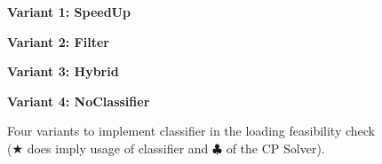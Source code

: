 \begin{figure}[ht]
    \centering

    \begin{minipage}[t]{0.45\textwidth}
        \textbf{Variant 1: SpeedUp}\par\vspace{0.5ex}
        \begin{algorithmic}[1]
            \EndWhile
        \end{algorithmic}
    \end{minipage}
    \hfill
    \begin{minipage}[t]{0.45\textwidth}
        \textbf{Variant 2: Filter}\par\vspace{0.5ex}
        \begin{algorithmic}[1]
            \EndWhile
        \end{algorithmic}
    \end{minipage}

    \vspace{2em} %

    \begin{minipage}[t]{0.45\textwidth}
        \textbf{Variant 3: Hybrid}\par\vspace{0.5ex}
        \begin{algorithmic}[1]
            \EndWhile
        \end{algorithmic}
    \end{minipage}
    \hfill
    \begin{minipage}[t]{0.45\textwidth}
        \textbf{Variant 4: NoClassifier}\par\vspace{0.5ex}
        \begin{algorithmic}[1]
            \EndWhile
        \end{algorithmic}
    \end{minipage}

    \vspace{1em}

    \caption{Four variants to implement classifier in the loading feasibility check ($\bigstar$
        does imply usage of classifier and $\clubsuit$ of the CP Solver).}
    \label{fig:four_variants}
\end{figure}
